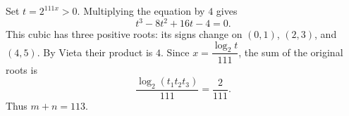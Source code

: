 Set $t=2^{111x}>0$. Multiplying the equation by $4$ gives
\[
t^3-8t^2+16t-4=0.
\]
This cubic has three positive roots: its signs change on $(0,1)$, $(2,3)$, and $(4,5)$. By Vieta their product is $4$. Since $x=\dfrac{\log_2t}{111}$, the sum of the original roots is
\[
\dfrac{\log_2(t_1t_2t_3)}{111}=\dfrac{2}{111}.
\]
Thus $\boxed{m+n=113}$.
